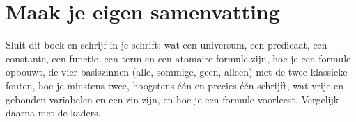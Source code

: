 
\ifzelfstudie
\section*{Maak je eigen samenvatting}
Sluit dit boek en schrijf in je schrift: wat een universum, een predicaat, een constante, een functie, een term en een atomaire formule zijn, hoe je een formule opbouwt, de vier basiszinnen (alle, sommige, geen, alleen) met de twee klassieke fouten, hoe je minstens twee, hoogstens één en precies één schrijft, wat vrije en gebonden variabelen en een zin zijn, en hoe je een formule voorleest. Vergelijk daarna met de kaders.
\fi
